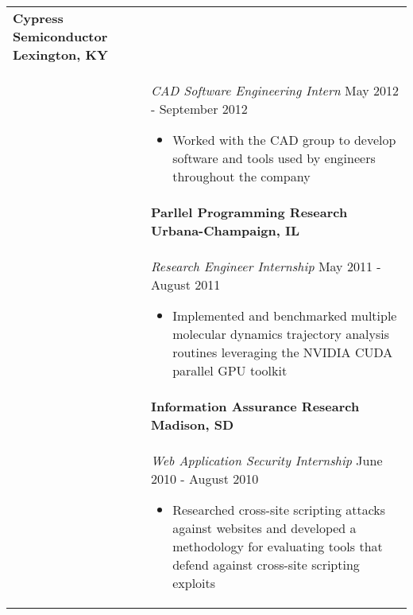 \documentclass[11pt]{article}
\begin{document}
\begin{tabular}{p{1.0in} p{5.16in}}
        \textbf{Cypress Semiconductor \hfill Lexington, KY}\vspace{0.015in} \\ &
        {\textit{CAD Software Engineering Intern} \hfill May 2012 - September 2012}\vspace{0.015in}
        \begin{itemize}
            \renewcommand{\labelitemi}{$\diamond$}
            \item Worked with the CAD group to develop software and tools used by engineers throughout the company
        \end{itemize} \\ &

        \textbf{Parllel Programming Research \hfill Urbana-Champaign, IL}\vspace{0.015in} \\ &
        \textit{Research Engineer Internship} \hfill May 2011 - August 2011 \vspace{0.0175in}
        \begin{itemize}
            \renewcommand{\labelitemi}{$\diamond$}
            \item Implemented and benchmarked multiple molecular dynamics trajectory analysis routines leveraging the NVIDIA CUDA parallel GPU toolkit 
        \end{itemize} \\ &

        \textbf{Information Assurance Research \hfill Madison, SD}\vspace{0.015in} \\ &
        {\textit{Web Application Security Internship} \hfill June 2010 - August 2010}\vspace{0.015in}
        \begin{itemize}
            \renewcommand{\labelitemi}{$\diamond$}            
            \item Researched cross-site scripting attacks against websites and developed a methodology for evaluating tools that defend against cross-site scripting exploits
        \end{itemize} \\
        


\end{tabular}
\end{document}
